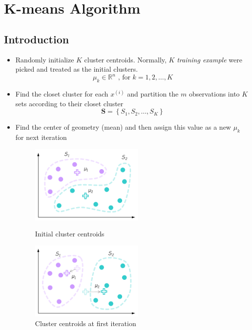 \chapter{K-means Algorithm}


\section{Introduction}
\begin{itemize}
    \item Randomly initialize $K$ cluster centroids. Normally, $K$ \emph{training example} were picked and treated as the initial clusters. 
    \begin{equation}
        \mu_k \in \mathbb{R}^n \text{ , for } k=1,2,\dots,K
    \end{equation}
    
    \item Find the closet cluster for each $x^{(i)}$ and 
    partition the $m$ observations into $K$ sets according to their closet cluster
    \begin{equation}
        \textbf{S} = \left\{S_1, S_2, \dots, S_K\right\}
    \end{equation}
    
    \item Find the center of geometry (mean) and then assign this value as a new $\mu_k$ for next iteration

    \begin{figure}[!htbp]
        \begin{minipage}[t]{0.5\textwidth}
            \centering
            \includegraphics[width=2.2in]{./images/kClusterInitial.png}
            \caption{Initial cluster centroids}
        \end{minipage}
        \begin{minipage}[t]{0.45\textwidth}
            \centering
            \includegraphics[width=2.2in]{./images/kClusterIter.png}
            \caption{Cluster centroids at first iteration}
        \end{minipage}
    \end{figure}
    

\end{itemize}
